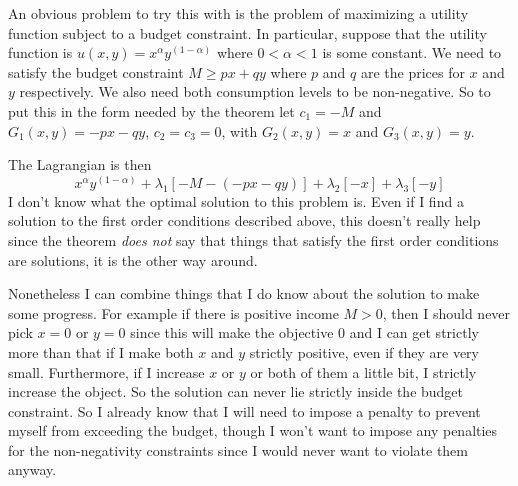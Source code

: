 \documentclass{article}
\begin{document}
An obvious problem to try this with is the problem of maximizing a utility
function subject to a budget constraint. In particular, suppose that the
utility function is $u\left(  x,y\right)  =x^{\alpha}y^{\left(  1-\alpha
\right)  }$ where $0<\alpha<1$ is some constant. We need to satisfy the budget
constraint $M\geq px+qy$ where $p$ and $q$ are the prices for $x$ and $y$
respectively. We also need both consumption levels to be non-negative. So to
put this in the form needed by the theorem let $c_{1}=-M$ and $G_{1}\left(
x,y\right)  =-px-qy$, $c_{2}=c_{3}=0$, with $G_{2}\left(  x,y\right)  =x$ and
$G_{3}\left(  x,y\right)  =y$. 

The Lagrangian is then%
\[
x^{\alpha}y^{\left(  1-\alpha\right)  }+\lambda_{1}\left[  -M-\left(
-px-qy\right)  \right]  +\lambda_{2}[-x]+\lambda_{3}\left[  -y\right]
\]
I don't know what the optimal solution to this problem is. Even if I find a
solution to the first order conditions described above, this doesn't really
help since the theorem \emph{does not} say that things that satisfy the first
order conditions are solutions, it is the other way around.

Nonetheless I can combine things that I do know about the solution to make
some progress. For example if there is positive income $M>0$, then I should
never pick $x=0$ or $y=0$ since this will make the objective $0$ and I can get
strictly more than that if I make both $x$ and $y$ strictly positive, even if
they are very small. Furthermore, if I increase $x$ or $y$ or both of them a
little bit, I strictly increase the object. So the solution can never lie
strictly inside the budget constraint. So I already know that I will need to
impose a penalty to prevent myself from exceeding the budget, though I won't
want to impose any penalties for the non-negativity constraints since I would
never want to violate them anyway.
\end{document}
